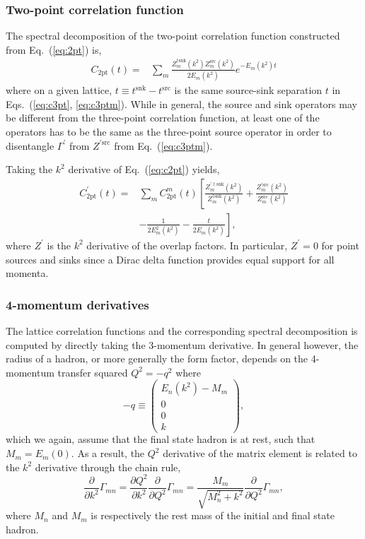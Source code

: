 \documentclass[prd,aps,twocolumn,superscriptaddress,tightenlines,nofootinbib,floatfix,preprintnumbers,10pt]{revtex4-1}
\begin{document}
\subsubsection{Two-point correlation function}
The spectral decomposition of the two-point correlation function constructed from Eq.~(\ref{eq:2pt}) is,
\begin{align}
C_{\mathrm{2pt}}(t) = & \sum_m \frac{Z^{\dagger\mathrm{snk}}_m(k^2)Z^{\mathrm{src}}_m(k^2)}{2E_m(k^2)}e^{-E_m(k^2)t}
\label{eq:c2pt}
\end{align}
where on a given lattice, $t\equiv t^{\mathrm{snk}}-t^{\mathrm{src}}$ is the same source-sink separation $t$ in Eqs.~(\ref{eq:c3pt}, \ref{eq:c3ptm}). While in general, the source and sink operators may be different from the three-point correlation function, at least one of the operators has to be the same as the three-point source operator in order to disentangle $\Gamma^\prime$ from $Z^{\prime\mathrm{src}}$ from Eq.~(\ref{eq:c3ptm}).

Taking the $k^2$ derivative of Eq.~(\ref{eq:c2pt}) yields,
\begin{align}
C^\prime_{\mathrm{2pt}}(t) = & \sum_m C_{\mathrm{2pt}}^m(t)\left[\frac{Z^{\prime\dagger\mathrm{snk}}_m(k^2)}{Z^{\dagger\mathrm{snk}}_m(k^2)}+\frac{Z^{\prime\mathrm{src}}_m(k^2)}{Z^{\mathrm{src}}_m(k^2)}\right.\nonumber \\
&\left.-\frac{1}{2E_m^2(k^2)}-\frac{t}{2E_m(k^2)}\right],
\end{align}
where $Z^\prime$ is the $k^2$ derivative of the overlap factors. In particular, $Z^\prime = 0$ for point sources and sinks since a Dirac delta function provides equal support for all momenta.

\subsubsection{4-momentum derivatives}
The lattice correlation functions and the corresponding spectral decomposition is computed by directly taking the 3-momentum derivative. In general however, the radius of a hadron, or more generally the form factor, depends on the 4-momentum transfer squared $Q^2 = -q^2$ where
\begin{equation}
-q \equiv \begin{pmatrix} E_n(k^2)-M_m \\ 0 \\ 0 \\ k \end{pmatrix},
\end{equation}
which we again, assume that the final state hadron is at rest, such that $M_m = E_m(0)$. As a result, the $Q^2$ derivative of the matrix element is related to the $k^2$ derivative through the chain rule,
\begin{equation}
\frac{\partial}{\partial k^2}\Gamma_{mn} = \frac{\partial Q^2}{\partial k^2} \frac{\partial}{\partial Q^2} \Gamma_{mn} = \frac{M_m}{\sqrt{M_n^2+k^2}}\frac{\partial}{\partial Q^2} \Gamma_{mn},
\end{equation}
where $M_n$ and $M_m$ is respectively the rest mass of the initial and final state hadron.
\end{document}
